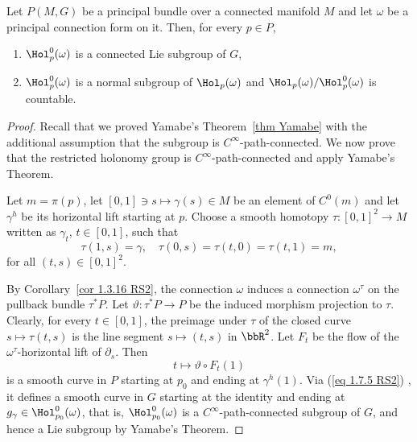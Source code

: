 \begin{thm}[{{\cite[Thm.~1.7.9]{RS2}}}]\label{thm 1.7.9 RS2}
    Let $P(M,G)$ be a principal bundle over a connected manifold $M$ and let $\omega$ be a principal connection form on it. Then, for every $p\in P$,
    \begin{enumerate}
        \item $\Hol_p^0(\omega)$ is a connected Lie subgroup of $G$,
        \item $\Hol_p^0(\omega)$ is a normal subgroup of $\Hol_p(\omega)$ and $\Hol_p(\omega)\slash \Hol_p^0(\omega)$ is countable.
    \end{enumerate}
\end{thm}
\begin{proof}
    Recall that we proved Yamabe's Theorem~\ref{thm Yamabe} with the additional assumption that the subgroup is $C^\infty$-path-connected. We now prove that the restricted holonomy group is $C^\infty$-path-connected and apply Yamabe's Theorem.

    Let $m=\pi(p)$, let $[0,1]\ni s\mapsto \gamma(s)\in M$ be an element of $C^0(m)$ and let $\gamma^h$ be its horizontal lift starting at $p$. Choose a smooth homotopy $\tau:[0,1]^2\to M$ written as $\gamma_t$, $t\in[0,1]$, such that
    \[\tau(1,s)=\gamma,\quad \tau(0,s)=\tau(t,0)=\tau(t,1)=m,\]
    for all $(t,s)\in [0,1]^2$.

    By Corollary~\ref{cor 1.3.16 RS2}, the connection $\omega$ induces a connection $\omega^\tau$ on the pullback bundle $\tau^\ast P$. Let $\vartheta:\tau^\ast P\to P$ be the induced morphism projection to $\tau$. Clearly, for every $t\in [0,1]$, the preimage under $\tau$ of the closed curve $s\mapsto \tau(t,s)$ is the line segment $s\mapsto (t,s)$ in $\bbR^2$. Let $F_t$ be the flow of the $\omega^\tau$-horizontal lift of $\partial_s$. Then
    \[t\mapsto \vartheta\circ F_t(1)\]
    is a smooth curve in $P$ starting at $p_0$ and ending at $\gamma^h(1)$. Via (\ref{eq 1.7.5 RS2}) , it defines a smooth curve in $G$ starting at the identity and ending at $g_\gamma\in \Hol^0_{p_0}(\omega)$, that is, $\Hol^0_{p_0}(\omega)$ is a $C^\infty$-path-connected subgroup of $G$, and hence a Lie subgroup by Yamabe's Theorem. 


\end{proof}
